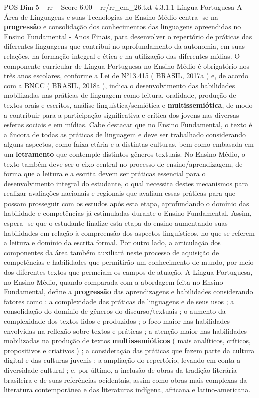 \begin{textsample}{POS Dim 5 – rr – Score 6.00 – rr/rr\_em\_26.txt}  \label{ex:f5_pos_221}
4.3.1.1 Língua Portuguesa A Área de Linguagens e suas Tecnologias no Ensino Médio centra -se na \textbf{progressão} e consolidação dos conhecimentos das linguagens apreendidas no Ensino Fundamental - Anos Finais, para desenvolver o repertório de práticas das diferentes linguagens que contribui no aprofundamento da autonomia, em suas relações, na formação integral e ética e na utilização das diferentes mídias.
O componente curricular de Língua Portuguesa no Ensino Médio é obrigatório nos três anos escolares, conforme a Lei de N{\EmojiFont °}13.415 ( BRASIL, 2017a ) e, de acordo com a BNCC ( BRASIL, 2018a ), indica o desenvolvimento das habilidades mobilizadas nas práticas de linguagem como leitura, oralidade, produção de textos orais e escritos, análise linguística/semiótica e \textbf{multissemiótica}, de modo a contribuir para a participação significativa e crítica dos jovens nas diversas esferas sociais e em mídias.
Cabe destacar que no Ensino Fundamental, o texto é a âncora de todas as práticas de linguagem e deve ser trabalhado considerando alguns aspectos, como faixa etária e a distintas culturas, bem como embasada em um \textbf{letramento} que contemple distintos gêneros textuais.
No Ensino Médio, o texto também deve ser o eixo central no processo de ensino/aprendizagem, de forma que a leitura e a escrita devem ser práticas essencial para o desenvolvimento integral do estudante, o qual necessita destes mecanismos para realizar avaliações nacionais e regionais que avaliam essas práticas para que possam prosseguir com os estudos após esta etapa, aprofundando o domínio das habilidade e competências já estimuladas durante o Ensino Fundamental.
Assim, espera -se que o estudante finalize esta etapa do ensino aumentando suas habilidades em relação à compreensão dos aspectos linguísticos, no que se referem a leitura e domínio da escrita formal.
Por outro lado, a articulação dos componentes da área também auxiliará neste processo de aquisição de competências e habilidades que permitirão um conhecimento de mundo, por meio dos diferentes textos que permeiam os campos de atuação.
A Língua Portuguesa, no Ensino Médio, quando comparada com a abordagem feita no Ensino Fundamental, define a \textbf{progressão} das aprendizagens e habilidades considerando fatores como : a complexidade das práticas de linguagens e de seus usos ; a consolidação do domínio de gêneros do discurso/textuais ; o aumento da complexidade dos textos lidos e produzidos ; o foco maior nas habilidades envolvidas na reflexão sobre textos e práticas ; a atenção maior nas habilidades mobilizadas na produção de textos \textbf{multissemióticos} ( mais analíticos, críticos, propositivos e criativos ) ; a consideração das práticas que fazem parte da cultura digital e das culturas juvenis ; a ampliação do repertório, levando em conta a diversidade cultural ; e, por último, a inclusão de obras da tradição literária brasileira e de suas referências ocidentais, assim como obras mais complexas da literatura contemporânea e das literaturas indígena, africana e latino-americana.

\end{textsample}
